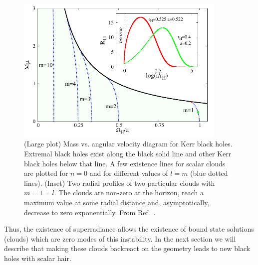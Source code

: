 \begin{figure}[H]
  \begin{center}
  \includegraphics[height=2.78in]{Figs/unstable-OmegaH-M-clouds.pdf}
  \end{center}
  \caption{(Large plot) Mass vs. angular velocity diagram for Kerr black holes. Extremal black holes exist along the black solid line and other Kerr black holes below that line. A few existence lines for scalar clouds are plotted for $n=0$ and for different values of $l=m$ (blue dotted lines). (Inset) Two radial profiles of two particular clouds with $m=1=l$. The clouds are non-zero at the horizon, reach a maximum value at some radial distance and, asymptotically, decrease to zero exponentially. From Ref.~\cite{Herdeiro:2014goa}.}
  \label{fig:clouds}
\end{figure}

Thus, the existence of superradiance allows the existence of bound state solutions (clouds) which are zero modes of this instability.
In the next section we will describe that making these clouds backreact on the geometry leads to new black holes with scalar hair.
